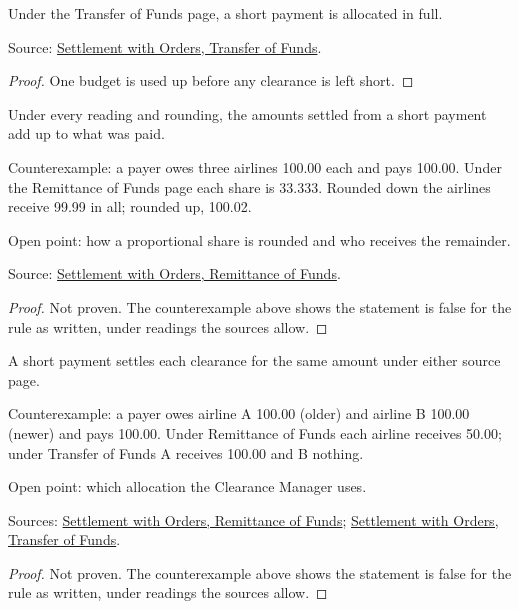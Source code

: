 \begin{theorem}
  \label{thm:accounting-transfer-allocates-all}
  Under the Transfer of Funds page, a short payment is allocated in full.

  Source: \href{https://standards.atlassian.net/wiki/spaces/SWO/pages/574488849}{Settlement with Orders, Transfer of Funds}.
\end{theorem}
\begin{proof}
  One budget is used up before any clearance is left short.
\end{proof}

\begin{theorem}
  \label{thm:accounting-allocation-whole}
  Under every reading and rounding, the amounts settled from a short
  payment add up to what was paid.

  Counterexample: a payer owes three airlines 100.00 each and pays 100.00.
  Under the Remittance of Funds page each share is 33.333.  Rounded down
  the airlines receive 99.99 in all; rounded up, 100.02.

  Open point: how a proportional share is rounded and who receives the
  remainder.

  Source: \href{https://standards.atlassian.net/wiki/spaces/SWO/pages/574718145}{Settlement with Orders, Remittance of Funds}.
\end{theorem}
\begin{proof}
  Not proven.  The counterexample above shows the statement is false for
  the rule as written, under readings the sources allow.
\end{proof}

\begin{theorem}
  \label{thm:accounting-one-allocation}
  A short payment settles each clearance for the same amount under either
  source page.

  Counterexample: a payer owes airline A 100.00 (older) and airline B
  100.00 (newer) and pays 100.00.  Under Remittance of Funds each airline
  receives 50.00; under Transfer of Funds A receives 100.00 and B nothing.

  Open point: which allocation the Clearance Manager uses.

  Sources: \href{https://standards.atlassian.net/wiki/spaces/SWO/pages/574718145}{Settlement with Orders, Remittance of Funds};
  \href{https://standards.atlassian.net/wiki/spaces/SWO/pages/574488849}{Settlement with Orders, Transfer of Funds}.
\end{theorem}
\begin{proof}
  Not proven.  The counterexample above shows the statement is false for
  the rule as written, under readings the sources allow.
\end{proof}
